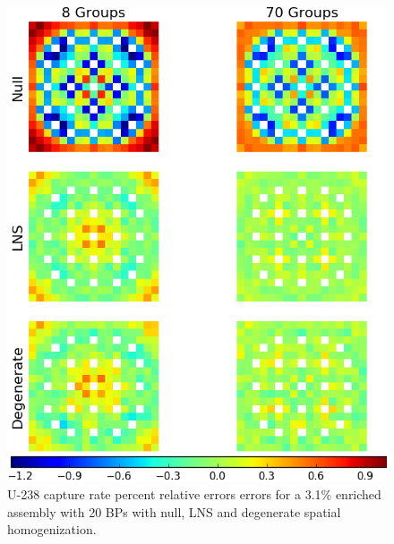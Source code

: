 \begin{figure}[h!]
\centering
\includegraphics[width=\linewidth]{figures/patterns/lns/assm-31-20BPs/capt-err}
\vspace{2mm}
\caption[U-238 capture rate errors for a 3.1\% enriched assembly with 20 BPs]{U-238 capture rate percent relative errors errors for a 3.1\% enriched assembly with 20 \acp{BP} with null, \ac{LNS} and degenerate spatial homogenization.}
\label{fig:chap9-assm-3.1-20BPs-lns-capt-err}
\end{figure}

\clearpage

